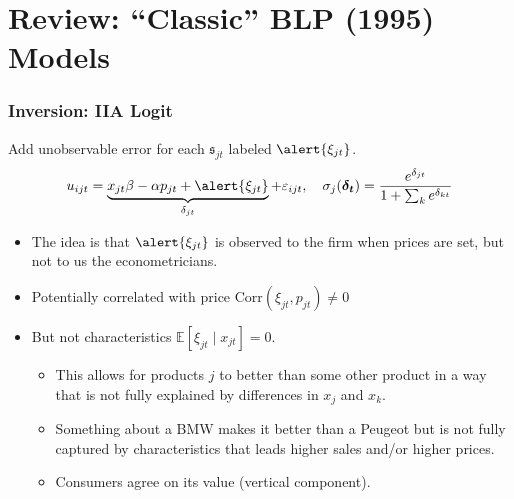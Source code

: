 


\section*{Review: ``Classic'' BLP (1995) Models}
\begin{frame}
\frametitle{Inversion: IIA Logit}
Add unobservable error for each $\mathfrak{s}_{jt}$ labeled $\alert{\xi_{jt}}$.
\begin{align*}
u_{ijt} = \underbrace{x_{jt} \beta -\alpha p_{jt} + \alert{\xi_{jt}}}_{\delta_{jt}} +  \varepsilon_{ijt} , \quad 
\sigma_j(\boldsymbol{\delta_{t}}) = \frac{e^{\delta_{jt}} }{1+\sum_k e^{\delta_{kt}} } 
\end{align*}
\vspace{-0.5cm}
\begin{itemize}
\item The idea is that $\alert{\xi_{jt}}$ is observed to the firm when prices are set, but not to us the econometricians.
\item Potentially correlated with price $\text{Corr}(\xi_{jt},p_{jt}) \neq 0$
\item But not characteristics $\mathbb{E}[\xi_{jt} \mid  x_{jt}]=0$.
\begin{itemize}
\item This allows for products $j$ to better than some other product in a way that is not fully explained by differences in $x_j$ and $x_k$.
\item Something about a BMW makes it better than a Peugeot but is not fully captured by characteristics that leads higher sales and/or higher prices.
\item Consumers agree on its value  (\alert{vertical component}).
\end{itemize}
\end{itemize}
\end{frame}



